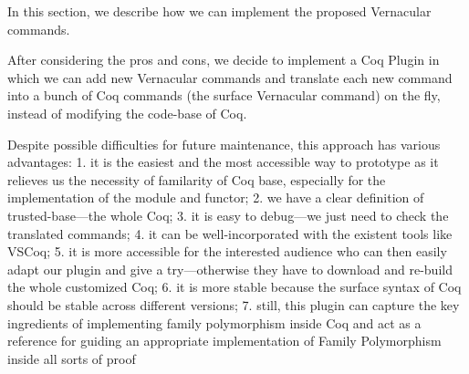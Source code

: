 In this section, we describe how we can implement the proposed Vernacular commands.

After considering the pros and cons, we decide to implement a Coq Plugin in which we can add new Vernacular commands and translate each new command into a bunch of Coq commands (the surface Vernacular command) on the fly, instead of modifying the code-base of Coq. 

Despite possible difficulties for future maintenance, this approach has
various advantages: 1. it is the easiest and the most accessible way to
prototype as it relieves us the necessity of familarity of Coq base,
especially for the implementation of the module and functor; 2. we have
a clear definition of trusted-base---the whole Coq; 3. it is easy to
debug---we just need to check the translated commands; 4. it can be
well-incorporated with the existent tools like VSCoq; 5. it is more
accessible for the interested audience who can then easily adapt our
plugin and give a try---otherwise they have to download and re-build the
whole customized Coq; 6. it is more stable because the surface syntax of
Coq should be stable across different versions; 7. still, this plugin
can capture the key ingredients of implementing family polymorphism
inside Coq and act as a reference for guiding an appropriate
implementation of Family Polymorphism inside all sorts of proof
